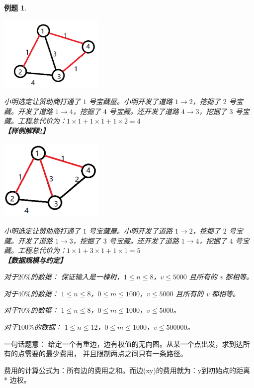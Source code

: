 \documentclass{article}
\newtheorem{example}{例题}[subsection]
\theoremstyle{nonumberplain}
\begin{document}
\begin{example}
	\begin{center}\includegraphics[width=5cm]{treasure_1.png}\end{center}
	小明选定让赞助商打通了 $1$ 号宝藏屋。小明开发了道路 $1 \to 2$，挖掘了 $2$ 号宝藏。开发了道路 $1 \to 4$，挖掘了 $4$ 号宝藏。还开发了道路 $4 \to 3$，挖掘了 $3$ 号宝藏。工程总代价为：$1 \times 1 + 1 \times 1 + 1 \times 2 = 4$
	\ \\
	\textbf{【样例解释$2$】}

	\begin{center}\includegraphics[width=5cm]{treasure_2.png}\end{center}

	小明选定让赞助商打通了 $1$ 号宝藏屋。小明开发了道路 $1 \to 2$，挖掘了 $2$ 号宝藏。开发了道路 $1 \to 3$，挖掘了 $3$ 号宝藏。还开发了道路 $1 \to 4$，挖掘了 $4$ 号宝藏。工程总代价为：$1 \times 1 + 3 \times 1 + 1 \times 1 = 5$
	\ \\
	\textbf{【数据规模与约定】}

	对于$20\%$的数据： 保证输入是一棵树，$1 \le n \le 8$，$v \le 5000$ 且所有的 v 都相等。

	对于$40\%$的数据： $1 \le n \le 8$，$0 \le m \le 1000$，$v \le 5000$ 且所有的 v 都相等。

	对于$70\%$的数据： $1 \le n \le 8$，$0 \le m \le 1000$，$v \le 5000$。

	对于$100\%$的数据： $1 \le n \le 12$，$0 \le m \le 1000$，$v \le 500000$。
\end{example}

一句话题意：
给定一个有重边，边有权值的无向图。从某一个点出发，求到达所有的点需要的最少费用，
并且限制两点之间只有一条路径。

费用的计算公式为：所有边的费用之和。而边(x\to y)的费用就为：y到初始点的距离 * 边权。
\end{document}
